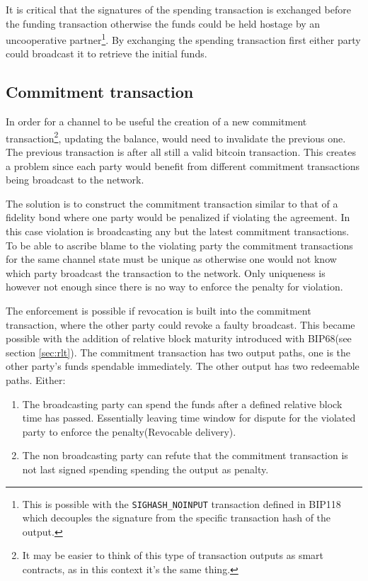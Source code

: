 It is critical that the signatures of the spending transaction is exchanged before the funding transaction otherwise the funds could be held hostage by an uncooperative partner\footnote{This is possible with the \texttt{SIGHASH\_NOINPUT} transaction defined in BIP118\cite{bip:0118:sighash:noinput} which decouples the signature from the specific transaction hash of the output.}. By exchanging the spending transaction first either party could broadcast it to retrieve the initial funds.

\subsection{Commitment transaction}

In order for a channel to be useful the creation of a new commitment transaction\footnote{It may be easier to think of this type of transaction outputs as smart contracts, as in this context it's the same thing.}, updating the balance, would need to invalidate the previous one. The previous transaction is after all still a valid bitcoin transaction. This creates a problem since each party would benefit from different commitment transactions being broadcast to the network.

The solution is to construct the commitment transaction similar to that of a fidelity bond where one party would be penalized if violating the agreement. In this case violation is broadcasting any but the latest commitment transactions. To be able to ascribe blame to the violating party the commitment transactions for the same channel state must be unique as otherwise one would not know which party broadcast the transaction to the network. Only uniqueness is however not enough since there is no way to enforce the penalty for violation.

The enforcement is possible if revocation is built into the commitment transaction, where the other party could revoke a faulty broadcast. This became possible with the addition of relative block maturity introduced with BIP68(see section \ref{sec:rlt}). The commitment transaction has two output paths, one is the other party's funds spendable immediately. The other output has two redeemable paths. Either:

\begin{enumerate}
	\item The broadcasting party can spend the funds after a defined relative block time has passed. Essentially leaving time window for dispute for the violated party to enforce the penalty(Revocable delivery).
	\item The non broadcasting party can refute that the commitment transaction is not last signed spending spending the output as penalty.
\end{enumerate}

